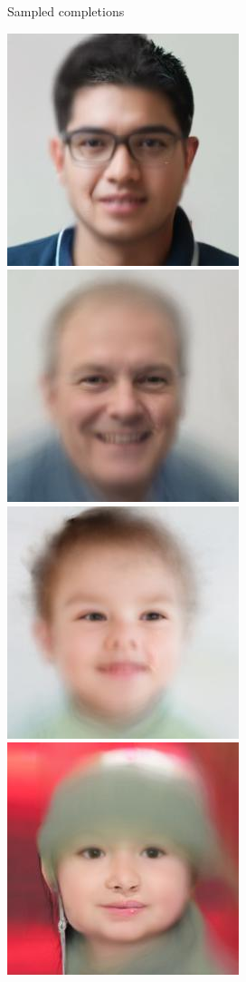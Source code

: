 \begin{figure}[t]
\begin{subfigure}[t]{0.73\textwidth}
    \caption{\scriptsize Sampled completions}
  \end{subfigure}
  \begin{subfigure}[t]{0.1\textwidth}
    \centering
    \includegraphics[height=\cmgfailureimgheight]{figs/cigcvae/co_mod_gan_failure/avg_co_mod_gan_0_3_2.jpg}
    \includegraphics[height=\cmgfailureimgheight]{figs/cigcvae/co_mod_gan_failure/avg_co_mod_gan_0_4_2.jpg}
    \includegraphics[height=\cmgfailureimgheight]{figs/cigcvae/co_mod_gan_failure/avg_co_mod_gan_1_4_2.jpg}
    \includegraphics[height=\cmgfailureimgheight]{figs/cigcvae/co_mod_gan_failure/avg_co_mod_gan_56_4_12.jpg}

\end{subfigure}
\end{figure}
